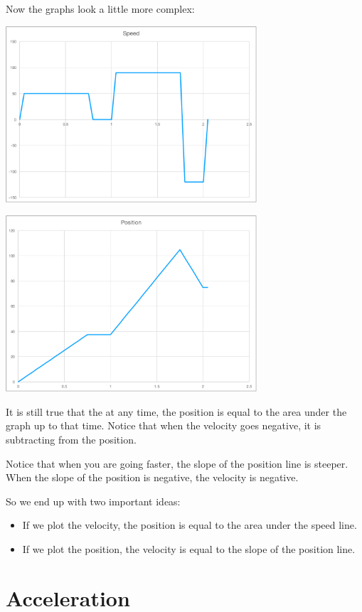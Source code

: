 Now the graphs look a little more complex:

\includegraphics[width=0.7\textwidth]{speed_stops.pdf}

\includegraphics[width=0.7\textwidth]{position_stops.pdf}

It is still true that the at any time, the position is equal to the
area under the graph up to that time.  Notice that when the velocity goes
negative, it is subtracting from the position.

Notice that when you are going faster, the slope of the position line
is steeper. When the slope of the position is negative, the velocity is
negative.

So we end up with two important ideas:
\begin{itemize}
\item If we plot the velocity, the position is equal to the area under the speed line.
\item If we plot the position, the velocity is equal to the slope of the position line.
\end{itemize}

\section{Acceleration}

